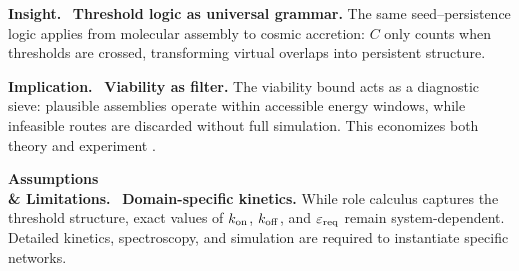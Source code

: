 \documentclass[12pt,a4paper,oneside]{scrreprt}
\newenvironment{insight}{\par\vspace{0.5em}\noindent\textbf{Insight.}\ }{\par\vspace{0.5em}}
\newenvironment{implication}{\par\vspace{0.5em}\noindent\textbf{Implication.}\ }{\par\vspace{0.5em}}
\newenvironment{limitation}{\par\vspace{0.5em}\noindent\textbf{Assumptions \\ \& Limitations.}\ }{\par\vspace{0.5em}}
\begin{document}
\begin{insight}
\textbf{Threshold logic as universal grammar.} 
The same seed–persistence logic applies from 
molecular assembly to cosmic accretion: 
$C$ only counts when thresholds are crossed, 
transforming virtual overlaps into persistent structure. 
\end{insight}

\begin{implication}
\textbf{Viability as filter.} 
The viability bound acts as a diagnostic sieve: 
plausible assemblies operate within accessible 
energy windows, while infeasible routes are 
discarded without full simulation. 
This economizes both theory and experiment 
\citep{Eigen1971SelfOrganization}. 
\end{implication}

\begin{limitation}
\textbf{Domain-specific kinetics.} 
While role calculus captures the threshold structure, 
exact values of $k_{\rm on}$, $k_{\rm off}$, and 
$\varepsilon_{\rm req}$ remain system-dependent. 
Detailed kinetics, spectroscopy, and simulation 
are required to instantiate specific networks. 
\end{limitation}
\end{document}
